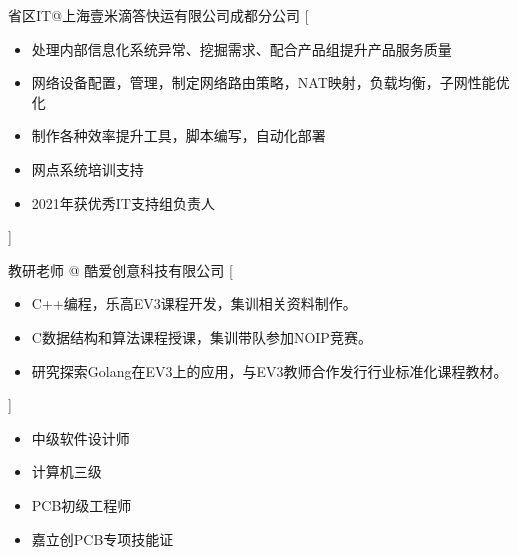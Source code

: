 \documentclass[zh]{resume}
\begin{document}
\begin{experiences}
    {省区IT@上海壹米滴答快运有限公司成都分公司}%
    [\begin{itemize}
      \item 处理内部信息化系统异常、挖掘需求、配合产品组提升产品服务质量
      \item 网络设备配置，管理，制定网络路由策略，NAT映射，负载均衡，子网性能优化
      \item 制作各种效率提升工具，脚本编写，自动化部署
      \item 网点系统培训支持
      \item 2021年获优秀IT支持组负责人
    \end{itemize}]

  \separator{0.5ex}
    {教研老师 @ 酷爱创意科技有限公司}%
    [\begin{itemize}
      \item C++编程，乐高EV3课程开发，集训相关资料制作。
      \item C数据结构和算法课程授课，集训带队参加NOIP竞赛。
      \item 研究探索Golang在EV3上的应用，与EV3教师合作发行行业标准化课程教材。
    \end{itemize}]
\end{experiences}
\begin{itemize}
  \item 中级软件设计师
  \item 计算机三级
  \item PCB初级工程师
  \item 嘉立创PCB专项技能证
\end{itemize}
\end{document}

